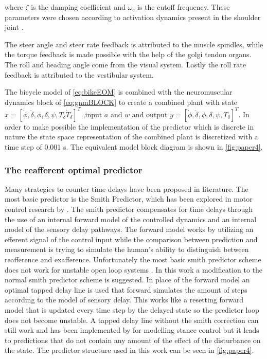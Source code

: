 where \ensuremath{\zeta} is the damping coefficient and \ensuremath{\omega_c} is the cutoff frequency. These  parameters were chosen according to activation dynamics present in the shoulder joint \cite{happee2008posture}.

The steer angle and steer rate feedback is attributed to the muscle spindles, while the torque feedback is made possible with the help of the golgi tendon organs. The roll and heading angle come from the visual system. Lastly the roll rate feedback is attributed to the vestibular system. 

The bicycle model of \cref{eq:bikeEOM} is combined with the neuromuscular dynamics block of \cref{eq:gnmBLOCK} to create a combined  plant with state \ensuremath{x=[\dot{\phi}, \dot{\delta}, \phi, \delta, \psi, T_\delta \dot{T}_\delta]^{T}} ,input \ensuremath{a} and \ensuremath{w} and output \ensuremath{y=[\dot{\phi}, \dot{\delta}, \phi, \delta, \psi, T_\delta]^{T}}. In order to make possible the implementation of the predictor which is discrete in nature the state space representation of the combined plant is discretized with a time step of 0.001 \si{\second}. The equivalent model block diagram is shown in \cref{fig:paper4}.

\subsubsection{The reafferent optimal predictor}
Many strategies to counter time delays have been proposed in literature. The most basic predictor is the Smith Predictor, which has been explored in motor control research by \citet{miall1993cerebellum}. The smith predictor compensates for time delays through the use of an internal forward model of the controlled dynamics and an internal model of the sensory delay pathways. The forward model works by utilizing an efferent signal of the control input while the comparison between prediction and measurement is trying to simulate the human's ability to distinguish between reafference and exafference.  Unfortunately the  most basic smith predictor scheme does not work for unstable open loop systems \cite{smith1957closed}. In this work a modification to the normal smith predictor scheme is suggested. In place of the forward model an optimal tapped delay line is used that forward simulates the amount of steps according to the model of sensory delay. This works like a resetting forward model that is updated every time step by the delayed state so the predictor loop does not become unstable. A tapped delay line without the smith  correction can still work and has been implemented by \citet{van2001adaptive} for modelling stance control but it leads to predictions that do not contain any amount of the effect of the disturbance on the state. The predictor structure used in this work  can be seen in \cref{fig:paper4}.



